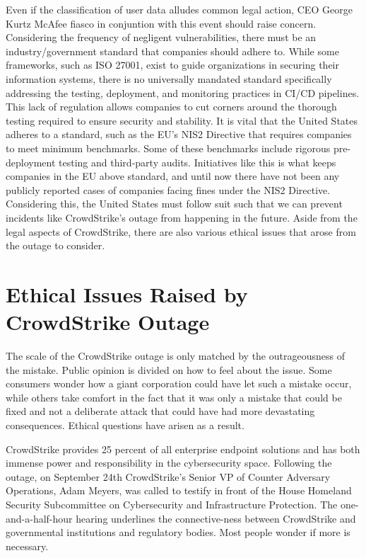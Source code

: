 Even if the classification of user data alludes common legal action, CEO George Kurtz McAfee fiasco in conjuntion with this event should raise concern. Considering the frequency of
negligent vulnerabilities, there must be an industry/government standard that companies should adhere to.  While some frameworks, such as ISO 27001, exist to guide organizations in securing their information systems,
there is no universally mandated standard specifically addressing the testing, deployment, and monitoring practices in CI/CD pipelines. This lack of regulation allows companies to cut corners around the thorough testing required to ensure security and stability.
It is vital that the United States adheres to a standard, such as the EU's NIS2 Directive that requires companies to meet minimum benchmarks.
Some of these benchmarks include rigorous pre-deployment testing and third-party audits. \cite{eu_nis2} Initiatives like this is what keeps companies in the EU above standard,
and until now there have not been any publicly reported cases of companies facing fines under the NIS2 Directive.
Considering this, the United States must follow suit such that we can prevent incidents like CrowdStrike's outage from happening in the future. Aside from the legal aspects of CrowdStrike, there are also various ethical issues that arose from the outage to consider.

\section{Ethical Issues Raised by CrowdStrike Outage}

The scale of the CrowdStrike outage is only matched by the outrageousness of the mistake. Public opinion is divided on how to feel about the issue. Some consumers wonder how a giant corporation could have let such a mistake occur, while others take comfort in the fact that it was only a mistake that could be fixed and not a deliberate attack that could have had more devastating consequences.  Ethical questions have arisen as a result.

CrowdStrike provides 25 percent of all enterprise endpoint solutions and has both immense power and responsibility in the cybersecurity space. Following the outage, on September 24th CrowdStrike's Senior VP of Counter Adversary Operations, Adam Meyers, was called to testify in front of the House Homeland Security Subcommittee on Cybersecurity and Infrastructure Protection. The one-and-a-half-hour hearing underlines the connective-ness between CrowdStrike and governmental institutions and regulatory bodies. Most people wonder if more is necessary.

